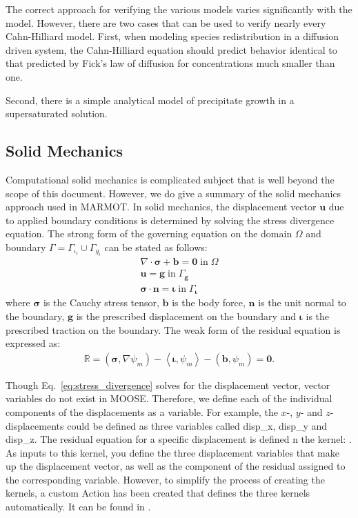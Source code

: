 \documentclass[letter,12pt,fleqn]{article}
\begin{document}
The correct approach for verifying the various models varies significantly with the model. However, there are two cases that can be used to verify nearly every Cahn-Hilliard model. First, when modeling species redistribution in a diffusion driven system, the Cahn-Hilliard equation should predict behavior identical to that predicted by Fick's law of diffusion for concentrations much smaller than one.

Second, there is a simple analytical model of precipitate growth in a supersaturated solution.

\subsection{Solid Mechanics}
Computational solid mechanics is complicated subject that is well beyond the scope of this document. However, we do give a summary of the solid mechanics approach used in MARMOT. In solid mechanics, the displacement vector $\mathbf{u}$ due to applied boundary conditions is determined by solving the stress divergence equation. The strong form of the governing equation on the domain $\Omega$ and boundary $\Gamma=\Gamma_{\mathit{\iota _i}}\cup\Gamma_{\mathit{g_i}}  $
can be stated as follows:
\begin{align}
\nabla \cdot\boldsymbol{\sigma} + \mathbf{b} = \mathbf{0} \;\mathrm{in}\;\Omega\\
\mathbf{u} = \mathbf{g}\;\mathrm{in}\;\Gamma_{ \mathbf{g}}\\
\boldsymbol{\sigma} \cdot \mathbf{n}=\boldsymbol{\iota}\;\mathrm{in}\;\Gamma_{ \boldsymbol{\iota}}
\end{align}
where $\boldsymbol{\sigma}$  is the Cauchy stress tensor, $\mathbf{b}$ is the body force, $\mathbf{n}$ is the unit normal to the boundary, $\mathbf{g}$ is the prescribed displacement on the boundary and $\boldsymbol{\iota}$ is the prescribed traction on the boundary. The weak form of the residual equation is expressed as:
\begin{eqnarray}
	\mathbb{R} = \left( \boldsymbol{\sigma}, \nabla \psi_m \right) - \left< \boldsymbol{\iota}, \psi_m \right> - \left( \mathbf{b}, \psi_m \right)  = \mathbf{0}. \label{eq:stress_divergence}
\end{eqnarray}

Though Eq.~\eqref{eq:stress_divergence} solves for the displacement vector, vector variables do not exist in MOOSE. Therefore, we define each of the individual components of the displacements as a variable. For example, the $x$-, $y$- and $z$-displacements could be defined as three variables called disp\_x, disp\_y and disp\_z. The residual equation for a specific displacement is defined n the kernel: \sloppy{}. As inputs to this kernel, you define the three displacement variables that make up the displacement vector, as well as the component of the residual assigned to the corresponding variable. However, to simplify the process of creating the kernels, a custom Action has been created that defines the three kernels automatically. It can be found in  .
\end{document}
